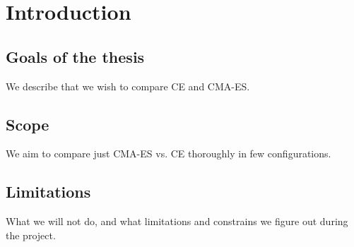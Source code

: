 \section{Introduction}

\subsection{Goals of the thesis}

We describe that we wish to compare CE and CMA-ES.

\subsection{Scope}

We aim to compare just CMA-ES vs. CE thoroughly in few 
configurations.

\subsection{Limitations}

What we will not do, and what limitations and constrains
we figure out during the project.

